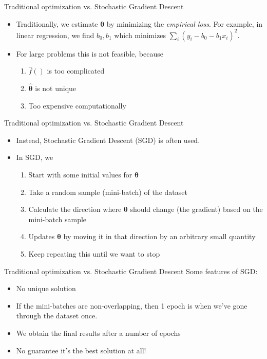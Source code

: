 \documentclass{beamer}
\begin{document}
\begin{frame}{Traditional optimization vs. Stochastic Gradient Descent}
\begin{itemize}
	\item Traditionally, we estimate $\boldsymbol{\theta}$ by minimizing the \emph{empirical loss}. For example, in linear regression, we find $b_0, b_1$ which minimizes $\sum_i (y_i - b_0 - b_1x_i)^2$. 
	\item For large problems this is not feasible, because 
	\begin{enumerate}
		\item $\hat{f}()$ is too complicated
		\item $\hat{\boldsymbol{\theta}}$ is not unique
		\item Too expensive computationally
	\end{enumerate}
\end{itemize}
\end{frame}

\begin{frame}{Traditional optimization vs. Stochastic Gradient Descent}
\begin{itemize}
	\item Instead, Stochastic Gradient Descent (SGD) is often used. 
	\item In SGD, we 
	\begin{enumerate}
		\item Start with some initial values for $\boldsymbol{\theta}$
		\item Take a random sample (mini-batch) of the dataset
		\item Calculate the direction where $\boldsymbol{\theta}$ should change (the gradient) based on the mini-batch sample
		\item Updates $\boldsymbol{\theta}$ by moving it in that direction by an arbitrary small quantity
		\item Keep repeating this until we want to stop
	\end{enumerate}
\end{itemize}
\end{frame}

\begin{frame}{Traditional optimization vs. Stochastic Gradient Descent}
Some features of SGD:
\begin{itemize}
	\item No unique solution
	\item If the mini-batches are non-overlapping, then 1 epoch is when we've gone through the dataset once. 
	\item We obtain the final results after a number of epochs
	\item No guarantee it's the best solution at all! 
\end{itemize}
\end{frame}
\end{document}

